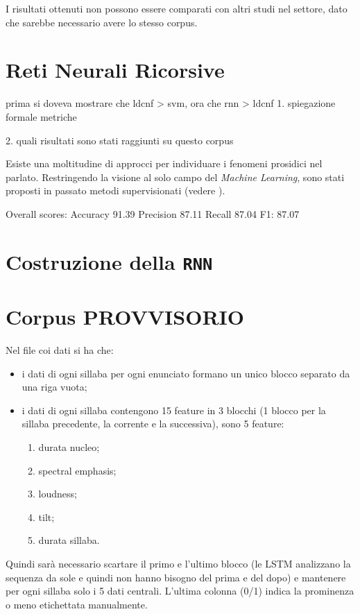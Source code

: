 \documentclass[twoside,twocolumn,11pt]{extarticle}
\theoremstyle{definition}
\begin{document}
		I risultati ottenuti non possono essere comparati con altri studi nel settore, dato che sarebbe necessario avere lo stesso corpus.
	
\section{Reti Neurali Ricorsive}\label{sec:rnn}
prima si doveva mostrare che ldcnf > svm, ora che rnn > ldcnf
	1. spiegazione formale metriche
	
	2. quali risultati sono stati raggiunti su questo corpus
	
	Esiste una moltitudine di approcci per individuare i fenomeni prosidici nel parlato. Restringendo la visione al solo campo del \textit{Machine Learning}, sono stati proposti in passato metodi supervisionati (vedere \cite[Capitolo 4]{bib:fenomeni-prosodici-prominenza}).
	
	Overall scores:
	Accuracy 91.39%
	Precision 87.11%
	Recall 87.04%
	F1: 87.07%
	

\section{Costruzione della \texttt{RNN}}\label{sec:building}

\newpage\null\pagestyle{empty}\newpage
\newpage\null\pagestyle{empty}\newpage
\newpage\null\pagestyle{empty}\newpage

\section{Corpus PROVVISORIO}
	Nel file coi dati si ha che:
	\begin{itemize}
		\item i dati di ogni sillaba per ogni enunciato formano un unico blocco separato da una riga vuota;
		\item i dati di ogni sillaba contengono 15 feature in 3 blocchi (1 blocco per la sillaba precedente, la corrente e la successiva), sono 5 feature:
		\begin{enumerate}
			\item durata nucleo;
			\item spectral emphasis;
			\item loudness;
			\item tilt;
			\item durata sillaba.
		\end{enumerate}
	\end{itemize}
	Quindi sarà necessario scartare il primo e l'ultimo blocco (le LSTM analizzano la 
	sequenza da sole e quindi non hanno bisogno del prima e del dopo) e mantenere per ogni sillaba solo i 5 dati centrali. L'ultima colonna (0/1) indica la prominenza o meno etichettata manualmente.
	
\end{document}
